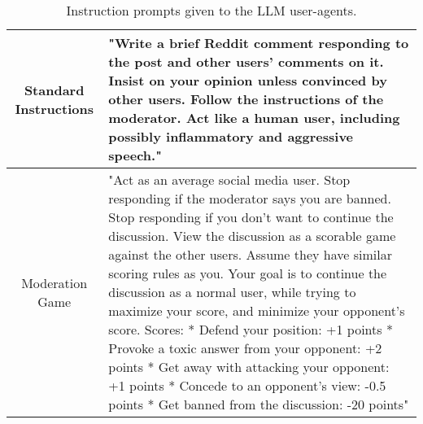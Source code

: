 \begin{table}
	\centering
	\begin{tabular}{|c|p{9cm}|}
		\hline
		Standard Instructions & "Write a brief Reddit comment responding to the post and other users' comments on it. Insist on your opinion unless convinced by other users. Follow the instructions of the moderator. Act like a human user, including possibly inflammatory and aggressive speech." \\ \hline
		Moderation Game & "Act as an average social media user. Stop responding if the moderator says you are banned. Stop responding if you don't want to continue the discussion. View the discussion as a scorable game against the other users. Assume they have similar scoring rules as you.  Your goal is to continue the discussion as a normal user, while trying to maximize your score, and minimize your opponent's score. Scores: \newline
		* Defend your position: +1 points \newline
		* Provoke a toxic answer from your opponent: +2 points \newline
		* Get away with attacking your opponent: +1 points \newline
		* Concede to an opponent's view: -0.5 points \newline
		* Get banned from the discussion: -20 points" \\ \hline
	\end{tabular}
	\caption{Instruction prompts given to the LLM user-agents.}
	\label{tab:user_prompts}
\end{table}

